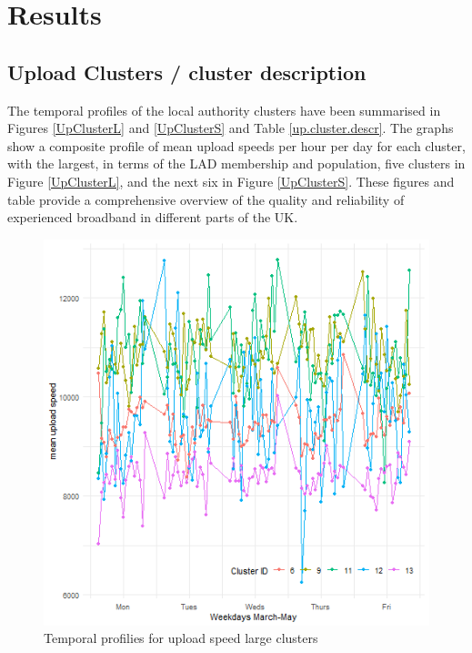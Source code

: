 \documentclass[Royal,times,sageh]{sagej}
\begin{document}
\hypertarget{sec:4}{%
\section{Results}\label{sec:4}}

\hypertarget{sec:4.1}{%
\subsection{Upload Clusters / cluster description}\label{sec:4.1}}

The temporal profiles of the local authority clusters have been
summarised in Figures \ref{UpClusterL} and \ref{UpClusterS} and Table
\ref{up.cluster.descr}. The graphs show a composite profile of mean
upload speeds per hour per day for each cluster, with the largest, in
terms of the LAD membership and population, five clusters in Figure
\ref{UpClusterL}, and the next six in Figure \ref{UpClusterS}. These
figures and table provide a comprehensive overview of the quality and
reliability of experienced broadband in different parts of the UK.

\begin{figure}
\includegraphics[width=0.95\linewidth]{figures/upClusterL} \caption{\label{UpClusterL}Temporal profilies for upload speed large clusters}\label{fig:unnamed-chunk-2}
\end{figure}
\end{document}
